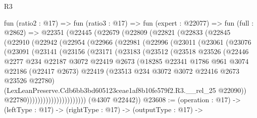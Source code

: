 \begin{lexlean}{R3}
\begin{coremodule}
  fun (ratio2 : @17) =>
  fun (ratio3 : @17) =>
  fun (expert : @22077) =>
  fun (full : @2862) =>
  @22351
    (@22445
      (@22679
        (@22809
          (@22821
            (@22833
              (@22845
                (@22910
                  (@22942
                    (@22954
                      (@22966
                        (@22981
                          (@22996
                            (@23011
                              (@23061
                                (@23076
                                  (@23091
                                    (@23141
                                      (@23156
                                        (@23171
                                          (@23183
                                            (@23512
                                              (@23518
                                                @23526
                                                (@22446
                                                  @2277
                                                  @234
                                                  @22187
                                                  @3072
                                                  @22419
                                                  @2673
                                                  (@18285
                                                    @22341
                                                    @1786
                                                    @961
                                                    @3074
                                                    @22186
                                                    (@22417 @2673)
                                                    @22419
                                                    (@23513
                                                      @234
                                                      @3072
                                                      @3072
                                                      @22416
                                                      @2673
                                                      @23526
                                                      @22780)
                                                    (LexLeanPreserve.Cdb6bb3bd605123ceae1af8b10fe579f2.R3.__rel_25
                                                      @22090))
                                                  @22780))))))))))))))))))))))
      (@4307 @22442))
@23608 := (operation : @17) ->
  (leftType : @17) ->
  (rightType : @17) ->
  (outputType : @17) ->

\end{coremodule}
\end{lexlean}
